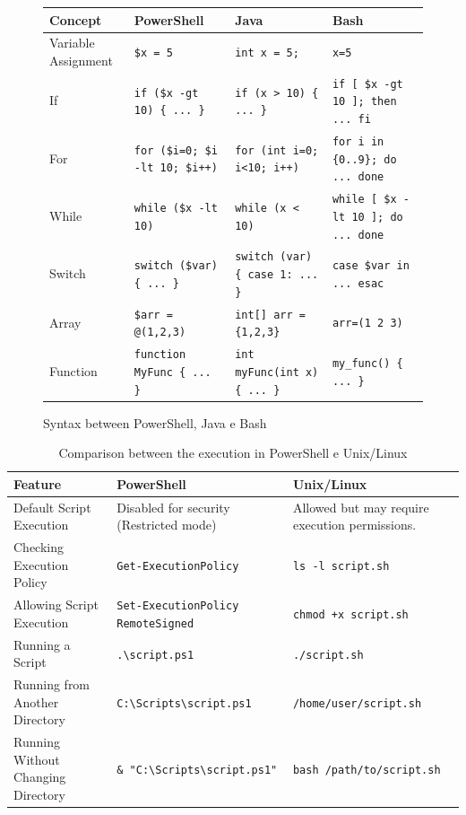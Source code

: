 \documentclass[a4paper]{article}
\begin{document}
\begin{figure}[H]
 \hspace{-2cm}
\renewcommand{\arraystretch}{1.2} %
\begin{tabular}{|p{3cm}|p{4cm}|p{4cm}|p{3cm}|}
    \hline
    \textbf{Concept	} & \textbf{PowerShell} & \textbf{Java} & \textbf{Bash} \\
    \hline
    Variable Assignment & \texttt{\$x = 5} & \texttt{int x = 5;} & \texttt{x=5} \\
    \hline
    If & \texttt{if (\$x -gt 10) \{ ... \}} & \texttt{if (x > 10) \{ ... \}} & \texttt{if [ \$x -gt 10 ]; then ... fi} \\
    \hline
    For & \texttt{for (\$i=0; \$i -lt 10; \$i++)} & \texttt{for (int i=0; i<10; i++)} & \texttt{for i in \{0..9\}; do ... done} \\
    \hline
    While & \texttt{while (\$x -lt 10)} & \texttt{while (x < 10)} & \texttt{while [ \$x -lt 10 ]; do ... done} \\
    \hline
    Switch & \texttt{switch (\$var) \{ ... \}} & \texttt{switch (var) \{ case 1: ... \}} & \texttt{case \$var in ... esac} \\
    \hline
    Array & \texttt{\$arr = @(1,2,3)} & \texttt{int[] arr = \{1,2,3\}} & \texttt{arr=(1 2 3)} \\
    \hline
    Function & \texttt{function MyFunc \{ ... \}} & \texttt{int myFunc(int x) \{ ... \}} & \texttt{my\_func() \{ ... \}} \\
    \hline
\end{tabular}
\caption{Syntax between PowerShell, Java e Bash}
\end{figure}
\begin{table}[h]
\hspace{-1.5cm}
\renewcommand{\arraystretch}{1.2}
\begin{tabular}{|p{3.5cm}|p{5cm}|p{5cm}|}
    \hline
    \textbf{Feature} & \textbf{PowerShell} & \textbf{Unix/Linux} \\
    \hline
    Default Script Execution & Disabled for security (Restricted mode) & Allowed but may require execution permissions. \\
    \hline
    Checking Execution Policy & \texttt{Get-ExecutionPolicy} & \texttt{ls -l script.sh} \\
    \hline
    Allowing Script Execution & \texttt{Set-ExecutionPolicy RemoteSigned} & \texttt{chmod +x script.sh} \\
    \hline
    Running a Script & \texttt{.\textbackslash script.ps1} & \texttt{./script.sh} \\
    \hline
    Running from Another Directory & \texttt{C:\textbackslash Scripts\textbackslash script.ps1} & \texttt{/home/user/script.sh} \\
    \hline
    Running Without Changing Directory & \texttt{\& "C:\textbackslash Scripts\textbackslash script.ps1"} & \texttt{bash /path/to/script.sh} \\
    \hline
\end{tabular}
\caption{Comparison between the execution in PowerShell e Unix/Linux}
\end{table}
\end{document}
